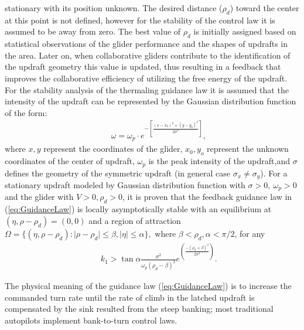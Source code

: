 \documentclass{ifacconf}
\begin{document}
stationary with its position unknown. The desired distance ($\rho_d$) toward
the center at this point is not defined, however for the stability of the
control law it is assumed to be away from zero. The best value of $\rho_d$ is
initially assigned based on statistical observations of the glider
performance and the shapes of updrafts in the area. Later on, when
collaborative gliders contribute to the identification of the updraft
geometry this value is updated, thus resulting in a feedback that improves
the collaborative efficiency of utilizing the free energy of the updraft. For
the stability analysis of the thermaling guidance law it is assumed that the
intensity of the updraft can be represented by the Gaussian distribution
function of the form:
\begin{eqnarray}
    && \omega=\omega_p \cdot e^{-[\frac{(x-x_0)^2+(y-y_0)^2}{2\sigma^2}]},
    \label{eq:GaussUpdraft}
\end{eqnarray}
where $x, y$ represent the coordinates of the glider, $x_0, y_o$ represent
the unknown coordinates of the center of updraft, $\omega_p$ is the peak
intensity of the updraft,and $\sigma$ defines the geometry of the symmetric
updraft (in general case $\sigma_x \neq \sigma_y$). For a stationary updraft
modeled by Gaussian distribution function with $\sigma>0,~\omega_p>0$ and the
glider with $V>0, \rho_d>0$, it is proven that the feedback guidance law in
(\ref{eq:GuidanceLaw}) is locally asymptotically stable with an equilibrium
at $(\eta, \rho-\rho_d)=(0,0)$ and a region of attraction $\Omega=\{(\eta,
\rho-\rho_d): \vert \rho-\rho_d \vert \leq \beta,  \vert \eta \vert \leq
\alpha \}, $ where $\beta < \rho_d, \alpha< \pi/2$, for any
\begin{eqnarray}
    && k_1 > \tan \alpha \frac{\sigma^2}{\omega_p(\rho_d-\beta)^2}
    e^(\frac{-(\rho_d+\beta)^2}{2\sigma^2} ).\nonumber
    \label{eq:GuidanceGain}
\end{eqnarray}

The physical meaning of the guidance law (\ref{eq:GuidanceLaw}) is to
increase the commanded turn rate until the rate of climb in the latched
updraft is compensated by the sink resulted from the steep banking; most
traditional autopilots implement bank-to-turn control laws.

\end{document}
